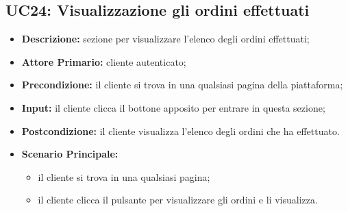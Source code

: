 \subsection{UC24: Visualizzazione gli ordini effettuati}
\label{sec:UC24}
\begin{itemize}
    \item \textbf{Descrizione:} sezione per visualizzare l'elenco degli ordini effettuati;
    \item \textbf{Attore Primario:} cliente autenticato;
    \item \textbf{Precondizione:} il cliente si trova in una qualsiasi pagina della piattaforma;
    \item \textbf{Input:} il cliente clicca il bottone apposito per entrare in questa sezione;
    \item \textbf{Postcondizione:} il cliente visualizza l'elenco degli ordini che ha effettuato.
    \item \textbf{Scenario Principale:}
          \begin{itemize}
              \item il cliente si trova in una qualsiasi pagina;
              \item il cliente clicca il pulsante per visualizzare gli ordini e li visualizza.
          \end{itemize}
\end{itemize}